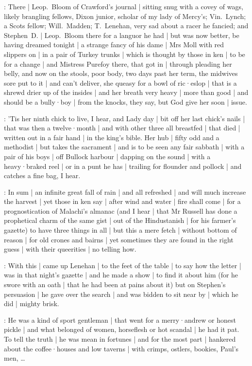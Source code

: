 :
There |
Leop.~Bloom of Crawford's journal |
sitting snug with a covey of wags,
likely brangling fellows,
Dixon junior,
scholar of my lady of Mercy's;
Vin.~Lynch;
a Scots fellow;
Will.~Madden;
T.~Lenehan,
very sad about a racer he fancied;
and Stephen~D. |
Leop.~Bloom there for a languor he had |
but was now better,
be having dreamed tonight |
a strange fancy of his dame |
Mrs Moll with red slippers on |
in a pair of Turkey trunks |
which is thought by those in ken |
to be for a change |
and Mistress Purefoy there,
that got in |
through pleading her belly,
and now on the stools,
poor body,
two days past her term,
the midwives sore put to it |
and can't deliver,
she queasy for a bowl of ric·eslop |
that is a shrewd drier up of the insides |
and her breath very heavy |
more than good |
and should be a bully·boy |
from the knocks,
they say,
but God give her soon |
issue.

:
'Tis her ninth chick to live,
I hear,
and Lady day |
bit off her last chick's nails |
that was then a twelve·month |
and with other three all breastfed |
that died |
written out in a fair hand |
in the king's bible.
Her hub |
fifty odd and a methodist |
but takes the sacrament |
and is to be seen any fair sabbath |
with a pair of his boys |
off Bullock harbour |
dapping on the sound |
with a heavy·braked reel |
or in a punt he has |
trailing for flounder and pollock |
and catches a fine bag,
I hear.

:
In sum |
an infinite great fall of rain |
and all refreshed |
and will much increase the harvest |
yet those in ken say |
after wind and water |
fire shall come |
for a prognostication of Malachi's almanac
(and I hear |
that Mr Russell has done a prophetical charm of the same gist |
out of the Hindustanish |
for his farmer's gazette)
to have three things in all |
but this a mere fetch |
without bottom of reason |
for old crones and bairns |
yet sometimes they are found in the right guess |
with their queerities |
no telling how.



:
With this |
came up Lenehan |
to the feet of the table |
to say how the letter |
was in that night's gazette |
and he made a show |
to find it about him
(for he swore with an oath |
that he had been at pains about it)
but on Stephen's persuasion |
he gave over the search |
and was bidden to sit near by |
which he did |
mighty brisk.

:
He was a kind of sport gentleman |
that went for a merry·andrew or honest pickle |
and what belonged of women,
horseflesh or hot scandal |
he had it pat.
To tell the truth |
he was mean in fortunes |
and for the most part |
hankered about the coffee·houses and low taverns |
with crimps,
ostlers,
bookies,
Paul's men,
\dots

